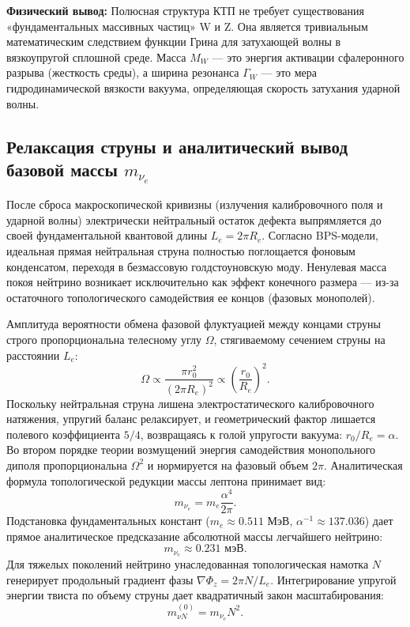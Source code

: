 \documentclass[11pt,a4paper]{article}
\begin{document}
\textbf{Физический вывод:} Полюсная структура КТП не требует существования «фундаментальных массивных частиц» W и Z. Она является тривиальным математическим следствием функции Грина для затухающей волны в вязкоупругой сплошной среде. Масса $M_W$ — это энергия активации сфалеронного разрыва (жесткость среды), а ширина резонанса $\Gamma_W$ — это мера гидродинамической вязкости вакуума, определяющая скорость затухания ударной волны. 

\subsection{Релаксация струны и аналитический вывод базовой массы $m_{\nu_e}$}
После сброса макроскопической кривизны (излучения калибровочного поля и ударной волны) электрически нейтральный остаток дефекта выпрямляется до своей фундаментальной квантовой длины $L_e = 2\pi R_e$.
Согласно BPS-модели, идеальная прямая нейтральная струна полностью поглощается фоновым конденсатом, переходя в безмассовую голдстоуновскую моду. Ненулевая масса покоя нейтрино возникает исключительно как эффект конечного размера — из-за остаточного топологического самодействия ее концов (фазовых монополей).

Амплитуда вероятности обмена фазовой флуктуацией между концами струны строго пропорциональна телесному углу $\Omega$, стягиваемому сечением струны на расстоянии $L_e$:
\begin{equation}
\Omega \propto \frac{\pi r_0^2}{(2\pi R_e)^2} \propto \left( \frac{r_0}{R_e} \right)^2.
\end{equation}
Поскольку нейтральная струна лишена электростатического калибровочного натяжения, упругий баланс релаксирует, и геометрический фактор лишается полевого коэффициента $5/4$, возвращаясь к голой упругости вакуума: $r_0/R_e = \alpha$.
Во втором порядке теории возмущений энергия самодействия монопольного диполя пропорциональна $\Omega^2$ и нормируется на фазовый объем $2\pi$. Аналитическая формула топологической редукции массы лептона принимает вид:
\begin{equation}
m_{\nu_e} = m_e \frac{\alpha^4}{2\pi}.
\end{equation}
Подстановка фундаментальных констант ($m_e \approx 0.511$ МэВ, $\alpha^{-1} \approx 137.036$) дает прямое аналитическое предсказание абсолютной массы легчайшего нейтрино:
\begin{equation}
m_{\nu_e} \approx 0.231 \text{ мэВ}.
\end{equation}
Для тяжелых поколений нейтрино унаследованная топологическая намотка $N$ генерирует продольный градиент фазы $\nabla \Phi_z = 2\pi N / L_e$. Интегрирование упругой энергии твиста по объему струны дает квадратичный закон масштабирования:
\begin{equation}
m_{\nu N}^{(0)} = m_{\nu_e} N^2.
\label{eq:neutrino_n2}
\end{equation}
	
\end{document}
